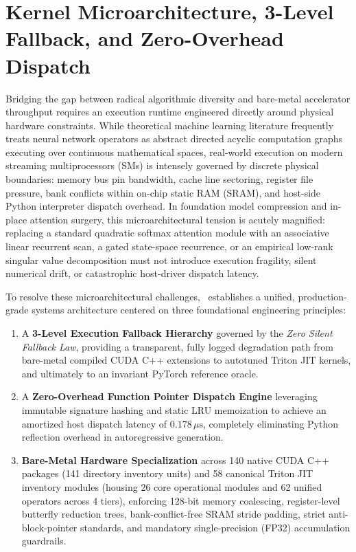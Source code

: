 
\section{Kernel Microarchitecture, 3-Level Fallback, and Zero-Overhead Dispatch}
\label{sec:kernel_microarchitecture}

Bridging the gap between radical algorithmic diversity and bare-metal accelerator throughput requires an execution runtime engineered directly around physical hardware constraints. While theoretical machine learning literature frequently treats neural network operators as abstract directed acyclic computation graphs executing over continuous mathematical spaces, real-world execution on modern streaming multiprocessors (SMs) is intensely governed by discrete physical boundaries: memory bus pin bandwidth, cache line sectoring, register file pressure, bank conflicts within on-chip static RAM (SRAM), and host-side Python interpreter dispatch overhead. In foundation model compression and in-place attention surgery, this microarchitectural tension is acutely magnified: replacing a standard quadratic softmax attention module with an associative linear recurrent scan, a gated state-space recurrence, or an empirical low-rank singular value decomposition must not introduce execution fragility, silent numerical drift, or catastrophic host-driver dispatch latency.

To resolve these microarchitectural challenges, \neuralops\ establishes a unified, production-grade systems architecture centered on three foundational engineering principles:
\begin{enumerate}
    \item A \textbf{3-Level Execution Fallback Hierarchy} governed by the \emph{Zero Silent Fallback Law}, providing a transparent, fully logged degradation path from bare-metal compiled CUDA C++ extensions to autotuned Triton JIT kernels, and ultimately to an invariant PyTorch reference oracle.
    \item A \textbf{Zero-Overhead Function Pointer Dispatch Engine} leveraging immutable signature hashing and static LRU memoization to achieve an amortized host dispatch latency of $0.178\,\mu\text{s}$, completely eliminating Python reflection overhead in autoregressive generation.
    \item \textbf{Bare-Metal Hardware Specialization} across 140 native CUDA C++ packages (141 directory inventory units) and 58 canonical Triton JIT inventory modules (housing 26 core operational modules and 62 unified operators across 4 tiers), enforcing 128-bit memory coalescing, register-level butterfly reduction trees, bank-conflict-free SRAM stride padding, strict anti-block-pointer standards, and mandatory single-precision (FP32) accumulation guardrails.
\end{enumerate}

